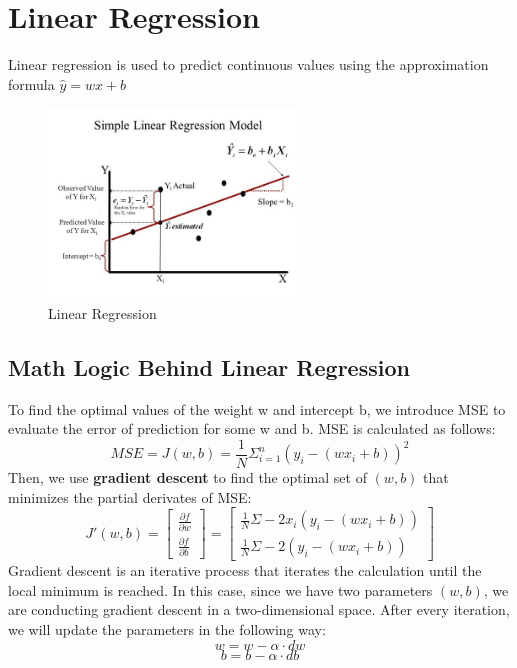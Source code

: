 \documentclass[12pt]{article}
\begin{document}
\section{Linear Regression}
Linear regression is used to predict continuous values using the approximation formula $\hat{y} = wx + b$
\begin{figure}[htbp]
\begin{center}
\includegraphics[width = 0.6\textwidth]{Images/Linear Regression.jpeg}
\caption{Linear Regression}
\label{default}
\end{center}
\end{figure}
\subsection{Math Logic Behind Linear Regression}
To find the optimal values of the weight w and intercept b, we introduce MSE to evaluate the error of prediction for some w and b. MSE is calculated as follows:
$$MSE = J(w, b) = \frac{1}{N}\Sigma_{i=1}^n(y_i - (wx_i + b))^2$$
Then, we use \textbf{gradient descent} to find the optimal set of $(w, b)$ that minimizes the partial derivates of MSE:
$$J'(w, b) = \begin{bmatrix} \frac{\partial f}{\partial w} \\ \frac{\partial f}{\partial b} \end{bmatrix} = \begin{bmatrix} \frac{1}{N}\Sigma -2x_i(y_i - (wx_i + b))\\ \frac{1}{N}\Sigma -2(y_i - (wx_i + b))\end{bmatrix}
$$
Gradient descent is an iterative process that iterates the calculation until the local minimum is reached. In this case, since we have two parameters $(w, b)$, we are conducting gradient descent in a two-dimensional space. After every iteration, we will update the parameters in the following way:
$$w = w - \alpha \cdot dw$$
$$b = b - \alpha \cdot db$$
\newpage
\end{document}
